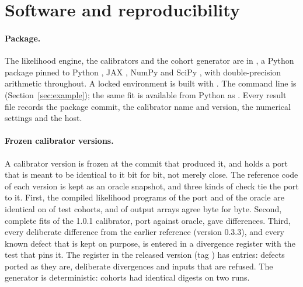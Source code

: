 \section{Software and reproducibility}\label{sec:software}

\paragraph{Package.} The likelihood engine, the calibrators and the cohort generator are in , a Python
package pinned to Python , JAX  \citep{bradbury2018jax}, NumPy  \citep{harris2020array} and
SciPy  \citep{virtanen2020scipy}, with double-precision arithmetic throughout. A locked environment is built
with . The command line is 
(Section~\ref{sec:example}); the same fit is available from Python as . Every result file
records the package commit, the calibrator name and version, the numerical settings and the host.

\paragraph{Frozen calibrator versions.} A calibrator version is frozen at the commit that produced it, and
 holds a port that is meant to be identical to it bit for bit, not merely close. The reference code of each
version is kept as an oracle snapshot, and three kinds of check tie the port to it. First, the compiled likelihood
programs of the port and of the oracle are identical on  of  test cohorts, and
 of  output arrays agree byte for byte. Second,  complete
fits of the 1.0.1 calibrator, port against oracle, gave  differences. Third, every deliberate difference from the earlier reference
(version 0.3.3), and every known defect that is kept on purpose, is entered in a divergence register with the test that
pins it. The register in the released version (tag ) has  entries:  defects ported as they
are,  deliberate divergences and  inputs that are refused. The generator
is deterministic:  cohorts had identical digests on two runs.

